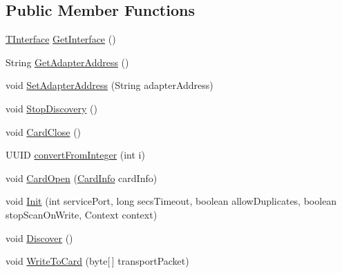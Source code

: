 \subsection*{Public Member Functions}
\begin{DoxyCompactItemize}
\item 
\mbox{\hyperlink{enumcom_1_1ethernom_1_1android_1_1etherapi_1_1link_layer_1_1_t_interface}{T\+Interface}} \mbox{\hyperlink{classcom_1_1ethernom_1_1android_1_1etherapi_1_1link_layer_1_1_ether_b_t_adapter_a4bc7f98a76ddf71b743daac86f4c5a91}{Get\+Interface}} ()
\item 
String \mbox{\hyperlink{classcom_1_1ethernom_1_1android_1_1etherapi_1_1link_layer_1_1_ether_b_t_adapter_a7af0ffd9265992004a5a0b67a5c7b68b}{Get\+Adapter\+Address}} ()
\item 
void \mbox{\hyperlink{classcom_1_1ethernom_1_1android_1_1etherapi_1_1link_layer_1_1_ether_b_t_adapter_a80aaeb9d8c44f40235533814db1b75e1}{Set\+Adapter\+Address}} (String adapter\+Address)
\item 
void \mbox{\hyperlink{classcom_1_1ethernom_1_1android_1_1etherapi_1_1link_layer_1_1_ether_b_t_adapter_afb99b565d023488ead67d41e7615b9b8}{Stop\+Discovery}} ()
\item 
void \mbox{\hyperlink{classcom_1_1ethernom_1_1android_1_1etherapi_1_1link_layer_1_1_ether_b_t_adapter_a5fa7afd43aba43e8dc79e831f4ef274d}{Card\+Close}} ()
\item 
U\+U\+ID \mbox{\hyperlink{classcom_1_1ethernom_1_1android_1_1etherapi_1_1link_layer_1_1_ether_b_t_adapter_a89cbe5764305e090c0f082436b09c9a7}{convert\+From\+Integer}} (int i)
\item 
void \mbox{\hyperlink{classcom_1_1ethernom_1_1android_1_1etherapi_1_1link_layer_1_1_ether_b_t_adapter_ab497ade3ef9529ee8c6355f53925092f}{Card\+Open}} (\mbox{\hyperlink{classcom_1_1ethernom_1_1android_1_1etherapi_1_1_card_info}{Card\+Info}} card\+Info)
\item 
void \mbox{\hyperlink{classcom_1_1ethernom_1_1android_1_1etherapi_1_1link_layer_1_1_ether_b_t_adapter_a07666a5fbd2327c57a2aff60e90028cd}{Init}} (int service\+Port, long secs\+Timeout, boolean allow\+Duplicates, boolean stop\+Scan\+On\+Write, Context context)
\item 
void \mbox{\hyperlink{classcom_1_1ethernom_1_1android_1_1etherapi_1_1link_layer_1_1_ether_b_t_adapter_a21a0fe01522036d0e40372a8423e14aa}{Discover}} ()
\item 
void \mbox{\hyperlink{classcom_1_1ethernom_1_1android_1_1etherapi_1_1link_layer_1_1_ether_b_t_adapter_ae1cc07da30ac57caf5891ae7d1b0268d}{Write\+To\+Card}} (byte\mbox{[}$\,$\mbox{]} transport\+Packet)
\end{DoxyCompactItemize}
